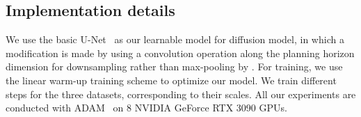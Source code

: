 \subsection{Implementation details}
We use the basic U-Net~\citep{ronneberger2015u} as our learnable model for diffusion model, in which a modification is made by using a convolution operation along the planning horizon dimension for downsampling rather than max-pooling by \citet{wang2023pdpp}. For training, we use the linear warm-up training scheme to optimize our model. We train different steps for the three datasets, corresponding to their scales. All our experiments are conducted with ADAM~\citep{kingma2014adam} on 8 NVIDIA GeForce RTX 3090 GPUs.